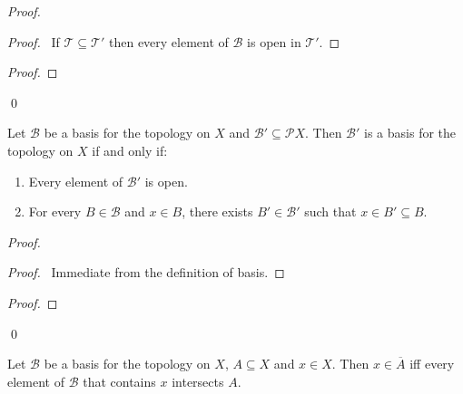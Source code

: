 \begin{proof}
  \pf
  \begin{proof}
    \pf\ If $\mathcal{T} \subseteq \mathcal{T}'$ then every element of $\mathcal{B}$ is open in $\mathcal{T}'$.
  \end{proof}
  \begin{proof}
  \end{proof}
  \qed
\end{proof}

\begin{prop}
  \label{prop:basis:second_basis}
  Let $\mathcal{B}$ be a basis for the topology on $X$ and $\mathcal{B}' \subseteq \mathcal{P} X$. Then $\mathcal{B}'$ is a basis for the topology on $X$ if and only if:
  \begin{enumerate}
    \item
    Every element of $\mathcal{B}'$ is open.
    \item
    For every $B \in \mathcal{B}$ and $x \in B$, there exists $B' \in \mathcal{B}'$ such that $x \in B' \subseteq B$.
  \end{enumerate}
\end{prop}

\begin{proof}
  \pf
  \begin{proof}
    \pf\ Immediate from the definition of basis.
  \end{proof}
  \begin{proof}
  \end{proof}
  \qed
\end{proof}

\begin{prop}
  \label{prop:basis:closure_membership}
    Let $\mathcal{B}$ be a basis for the topology on $X$, $A \subseteq X$ and $x \in X$. Then $x \in \overline{A}$ iff every element of $\mathcal{B}$ that contains $x$ intersects $A$.
\end{prop}

